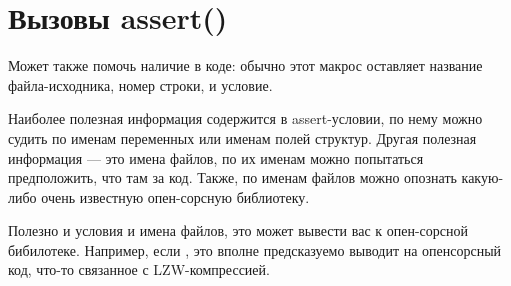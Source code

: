 \section{Вызовы assert()}
Может также помочь наличие  в коде: обычно этот макрос оставляет название файла-исходника, 
номер строки, и условие.

Наиболее полезная информация содержится в assert-условии, по нему можно судить по именам переменных
или именам полей структур. Другая полезная информация --- это имена файлов, по их именам можно попытаться
предположить, что там за код. Также, по именам файлов можно опознать какую-либо очень известную опен-сорсную
библиотеку.



Полезно  и условия и имена файлов, это может вывести вас к опен-сорсной бибилотеке.
Например, если  , 
это вполне предсказуемо выводит на опенсорсный код, что-то связанное с LZW-компрессией.

